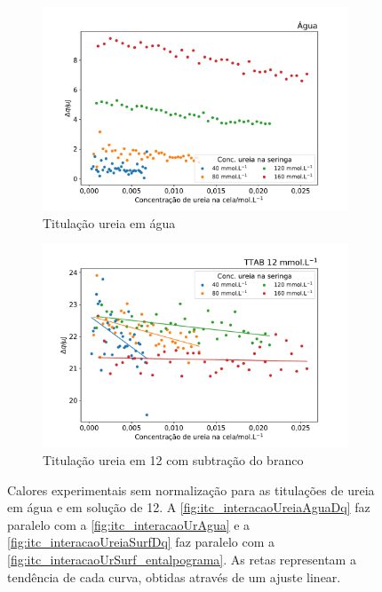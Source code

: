 \begin{figure}[h]
	\begin{subfigure}{0.45\textwidth}
		\centering
		\includegraphics[width=\textwidth]{imagens/itc/interacao_branco_dq}
		\caption{Titulação ureia em água}
		\label{fig:itc_interacaoUreiaAguaDq}
	\end{subfigure} \qquad%
	\begin{subfigure}{0.45\textwidth}
		\centering
		\includegraphics[width=\textwidth]{imagens/itc/interacao_ureia_surf_dq}
		\caption{Titulação ureia em \TTAB{} 12\mM{} com subtração do branco}
		\label{fig:itc_interacaoUreiaSurfDq}
	\end{subfigure}

	\caption{Calores experimentais sem normalização para as titulações de ureia em água e em solução de \TTAB{} 12\mM. A \autoref{fig:itc_interacaoUreiaAguaDq} faz paralelo com a \autoref{fig:itc_interacaoUrAgua} e a \autoref{fig:itc_interacaoUreiaSurfDq} faz paralelo com a \autoref{fig:itc_interacaoUrSurf_entalpograma}. As retas representam a tendência de cada curva, obtidas através de um ajuste linear.}
	\label{fig:itc_comparativo_tit_ureia_agua_ureia_ttab}
\end{figure}
	
